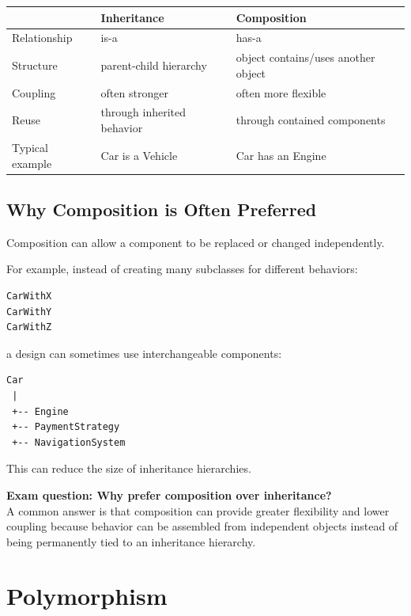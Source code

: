 \documentclass[11pt,a4paper]{article}
\begin{document}
\begin{tabularx}{\textwidth}{|p{}|X|X|}
\hline
 & \textbf{Inheritance} & \textbf{Composition}\\
\hline
Relationship & is-a & has-a\\
\hline
Structure & parent-child hierarchy & object contains/uses another object\\
\hline
Coupling & often stronger & often more flexible\\
\hline
Reuse & through inherited behavior & through contained components\\
\hline
Typical example & Car is a Vehicle & Car has an Engine\\
\hline
\end{tabularx}

\subsection{Why Composition is Often Preferred}

Composition can allow a component to be replaced or changed independently.

For example, instead of creating many subclasses for different behaviors:

\begin{verbatim}
CarWithX
CarWithY
CarWithZ
\end{verbatim}

a design can sometimes use interchangeable components:

\begin{verbatim}
Car
 |
 +-- Engine
 +-- PaymentStrategy
 +-- NavigationSystem
\end{verbatim}

This can reduce the size of inheritance hierarchies.

\begin{exambox}
\textbf{Exam question: Why prefer composition over inheritance?}\\
A common answer is that composition can provide greater flexibility and
lower coupling because behavior can be assembled from independent objects
instead of being permanently tied to an inheritance hierarchy.
\end{exambox}

\section{Polymorphism}
\end{document}
